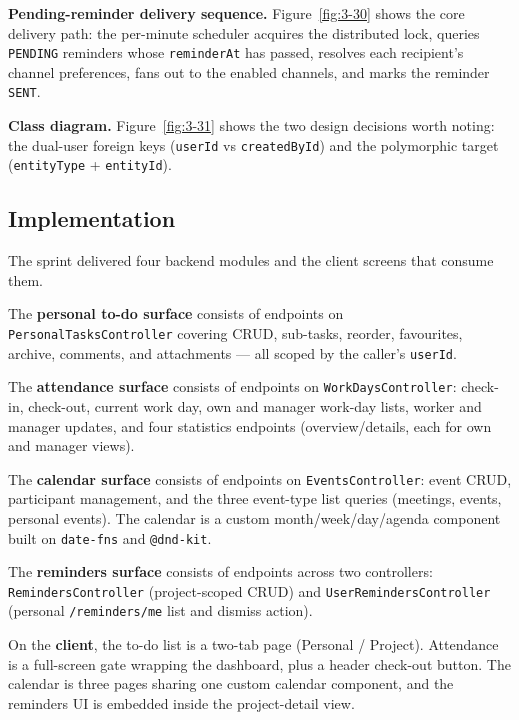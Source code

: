 \textbf{Pending-reminder delivery sequence.} Figure~\ref{fig:3-30} shows the core delivery path:
the per-minute scheduler acquires the distributed lock, queries \texttt{PENDING} reminders whose
\texttt{reminderAt} has passed, resolves each recipient's channel preferences, fans out to the
enabled channels, and marks the reminder \texttt{SENT}.


\textbf{Class diagram.} Figure~\ref{fig:3-31} shows the two design decisions worth noting: the
dual-user foreign keys (\texttt{userId} vs \texttt{createdById}) and the polymorphic target
(\texttt{entityType} + \texttt{entityId}).


\subsection{Implementation}

The sprint delivered four backend modules and the client screens that consume them.

The \textbf{personal to-do surface} consists of endpoints on
\texttt{PersonalTasksController} covering CRUD, sub-tasks, reorder, favourites,
archive, comments, and attachments --- all scoped by the caller's \texttt{userId}.

The \textbf{attendance surface} consists of endpoints on \texttt{WorkDaysController}:
check-in, check-out, current work day, own and manager work-day lists, worker and manager
updates, and four statistics endpoints (overview/details, each for own and manager views).

The \textbf{calendar surface} consists of endpoints on \texttt{EventsController}: event CRUD,
participant management, and the three event-type list queries (meetings, events, personal
events). The calendar is a custom month/week/day/agenda component built on \texttt{date-fns}
and \texttt{@dnd-kit}.

The \textbf{reminders surface} consists of endpoints across two controllers:
\texttt{RemindersController} (project-scoped CRUD) and \texttt{UserRemindersController}
(personal \texttt{/reminders/me} list and dismiss action).

On the \textbf{client}, the to-do list is a two-tab page (Personal / Project). Attendance is a
full-screen gate wrapping the dashboard, plus a header check-out button. The calendar is three
pages sharing one custom calendar component, and the reminders UI is embedded inside the
project-detail view.

